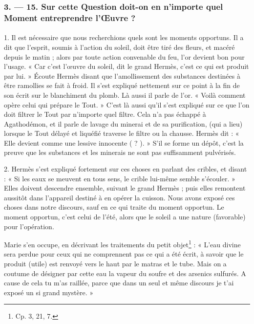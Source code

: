 \documentclass[landscape, a4paper, 11pt, oneside, polutonikogreek, french]{article}
\begin{document}
\bigskip
\centerline{\EightStarTaper}
\centerline{\EightStarTaper\EightStarTaper}
\bigskip

\subsubsection{3. --- 15. Sur cette Question doit-on en n'importe quel Moment entreprendre l'Œuvre ?}
\paragraph{}
1. Il est nécessaire que nous recherchions quels sont les moments opportuns. Il a dit que l'esprit, soumis à l'action du soleil, doit être tiré des fleurs, et macéré depuis le matin ; alors par toute action convenable du feu, l'or devient bon pour l'usage. « Car c'est l'œuvre du soleil, dit le grand Hermès, c'est ce qui est produit par lui. » Écoute Hermès disant que l'amollissement des substances destinées à être ramollies se fait à froid. Il s'est expliqué nettement sur ce point à la fin de son écrit sur le blanchiment du plomb. Là aussi il parle de l'or. « Voilà comment opère celui qui prépare le Tout. » C'est là aussi qu'il s'est expliqué sur ce que l'on doit filtrer le Tout par n'importe quel filtre. Cela n'a pas échappé à Agathodémon, et il parle de lavage du minerai et de sa purification, (qui a lieu) lorsque le Tout délayé et liquéfié traverse le filtre ou la chausse. Hermès dit : « Elle devient comme une lessive innocente ( ? ). » S'il se forme un dépôt, c'est la preuve que les substances et les minerais ne sont pas suffisamment pulvérisés.

2. Hermès s'est expliqué fortement sur ces choses en parlant des cribles, et disant : « Si les eaux se meuvent en tous sens, le crible lui-même semble s'écouler. » Elles doivent descendre ensemble, suivant le grand Hermès ; puis elles remontent aussitôt dans l'appareil destiné à en opérer la cuisson. Nous avons exposé ces choses dans notre discours, sauf en ce qui traite du moment opportun. Le moment opportun, c'est celui de l'été, alors que le soleil a une nature (favorable) pour l'opération.

Marie s'en occupe, en décrivant les traitements du petit objet\footnote{Cp. 3, 21, 7.} : « L'eau divine sera perdue pour ceux qui ne comprennent pas ce qui a été écrit, à savoir que le produit (utile) est renvoyé vers le haut par le matras et le tube. Mais on a coutume de désigner par cette eau la vapeur du soufre et des arsenics sulfurés. A cause de cela tu m'as raillée, parce que dans un seul et même discours je t'ai exposé un si grand mystère. »
\end{document}
